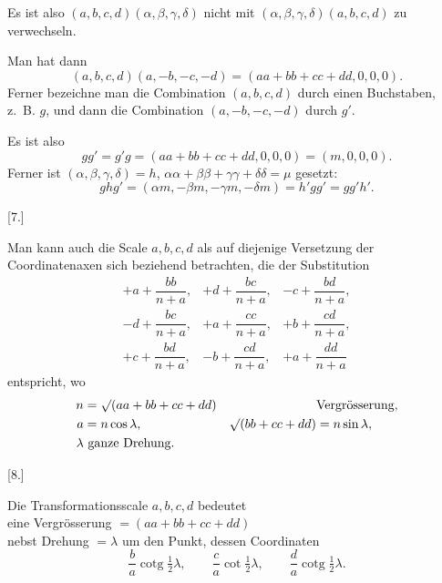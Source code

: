 %
\noindent Es ist also $(a,b,c,d)(\alpha,\beta,\gamma,\delta)$ nicht mit $(\alpha,\beta,\gamma,\delta)(a,b,c,d)$ zu verwechseln.

Man hat dann
\[
(a,b,c,d)(a,-b,-c,-d)=(aa+bb+cc+dd,0,0,0).
\]
Ferner bezeichne man die Combination $(a,b,c,d)$ durch einen Buchstaben, z.~B. $g$, und dann die Combination $(a,-b,-c,-d)$ durch $g'$.

Es ist also
\[
gg'=g'g=(aa+bb+cc+dd,0,0,0)=(m,0,0,0).
\]
Ferner ist $(\alpha,\beta,\gamma,\delta)=h$, $\alpha\alpha+\beta\beta+\gamma\gamma+\delta\delta=\mu$ gesetzt:
\[
ghg'=(\alpha m,-\beta m,-\gamma m,-\delta m)=h'gg'=gg'h'.
\]

\begin{center}[7.]\end{center}

Man kann auch die Scale $a,b,c,d$ als auf diejenige Versetzung der Coordinatenaxen sich beziehend betrachten, die der Substitution
\[
\begin{array}{ccc}
+a+\dfrac{bb}{n+a},&+d+\dfrac{bc}{n+a},&-c+\dfrac{bd}{n+a},\\[6pt]
-d+\dfrac{bc}{n+a},&+a+\dfrac{cc}{n+a},&+b+\dfrac{cd}{n+a},\\[6pt]
+c+\dfrac{bd}{n+a},&-b+\dfrac{cd}{n+a},&+a+\dfrac{dd}{n+a}
\end{array}
\]
entspricht, wo
\[
\begin{aligned}
n&=\mathord{\surd}(aa+bb+cc+dd)&&\text{Vergrösserung,}\\
a&=n\cos\lambda,&\mathord{\surd}(bb+cc+dd)&=n\sin\lambda,\\
\lambda&\text{ ganze Drehung.}
\end{aligned}
\]

\begin{center}[8.]\end{center}

Die Transformationsscale $a,b,c,d$ bedeutet\\
eine Vergrösserung $=(aa+bb+cc+dd)$\\
nebst Drehung $=\lambda$ um den Punkt, dessen Coordinaten
\[
\frac ba\operatorname{cotg}\tfrac12\lambda,\qquad
\frac ca\cot\tfrac12\lambda,\qquad
\frac da\operatorname{cotg}\tfrac12\lambda.
\]
